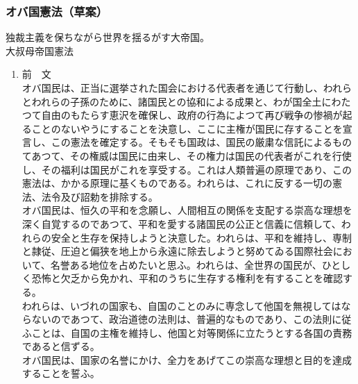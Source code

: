 \subsubsection{オバ国憲法（草案）}
独裁主義を保ちながら世界を揺るがす大帝国。\\
大叔母帝国憲法\\
\begin{enumerate}
\item 前　文\\ 
オバ国民は、正当に選挙された国会における代表者を通じて行動し、われらとわれらの子孫のために、諸国民との協和による成果と、わが国全土にわたつて自由のもたらす恵沢を確保し、政府の行為によつて再び戦争の惨禍が起ることのないやうにすることを決意し、ここに主権が国民に存することを宣言し、この憲法を確定する。そもそも国政は、国民の厳粛な信託によるものてあつて、その権威は国民に由来し、その権力は国民の代表者がこれを行使し、その福利は国民がこれを享受する。これは人類普遍の原理であり、この憲法は、かかる原理に基くものである。われらは、これに反する一切の憲法、法令及び詔勅を排除する。 \\
オバ国民は、恒久の平和を念願し、人間相互の関係を支配する崇高な理想を深く自覚するのであつて、平和を愛する諸国民の公正と信義に信頼して、われらの安全と生存を保持しようと決意した。われらは、平和を維持し、専制と隷従、圧迫と偏狭を地上から永遠に除去しようと努めてゐる国際社会において、名誉ある地位を占めたいと思ふ。われらは、全世界の国民が、ひとしく恐怖と欠乏から免かれ、平和のうちに生存する権利を有することを確認する。\\ 
われらは、いづれの国家も、自国のことのみに専念して他国を無視してはならないのであつて、政治道徳の法則は、普遍的なものであり、この法則に従ふことは、自国の主権を維持し、他国と対等関係に立たうとする各国の責務であると信ずる。\\
オバ国民は、国家の名誉にかけ、全力をあげてこの崇高な理想と目的を達成することを誓ふ。\\


\end{enumerate}
